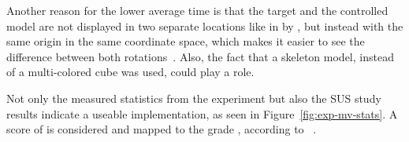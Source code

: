 Another reason for the lower average time is that the target and the controlled model are not displayed in two separate locations like in {} by \citeauthor{Katzakis.2010}, but instead with the same origin in the same coordinate space, which makes it easier to see the difference between both rotations~\cite[140]{Katzakis.2010}. Also, the fact that a skeleton model, instead of a multi-colored cube was used, could play a role.

Not only the measured statistics from the experiment but also the \gls{SUS} study results indicate a useable implementation, as seen in Figure~\ref{fig:exp-mv-stats}. A score of \evalExpMvSusScore{} is considered \evalExpMvSusAdj{} and mapped to the grade \evalExpMvSusGrade, according to \citeauthor{Bangor.2009}~\cite[120\psq]{Bangor.2009}.

